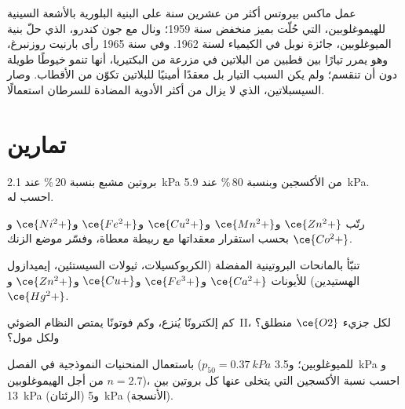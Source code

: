 \begin{history}
عمل ماكس بيروتس أكثر من عشرين سنة على البنية البلورية بالأشعة السينية
للهيموغلوبين، التي حُلّت بميز منخفض سنة 1959؛ ونال مع جون كندرو، الذي حلّ
بنية الميوغلوبين، جائزة نوبل في الكيمياء لسنة 1962. وفي سنة 1965 رأى بارنيت
روزنبرغ، وهو يمرر تيارًا بين قطبين من البلاتين في مزرعة من
البكتيريا، أنها تنمو خيوطًا طويلة دون أن تنقسم؛ ولم يكن السبب
التيار بل معقدًا أمينيًا للبلاتين تكوّن من الأقطاب. وصار
السيسبلاتين، الذي لا يزال من أكثر الأدوية المضادة للسرطان استعمالًا.
\end{history}

\section{تمارين}

\begin{exercise}[$\star$]\label{exo:b3:bioinorganic:1}
بروتين مشبع بنسبة 20\,\% عند \qty{2.1}{kPa} من الأكسجين وبنسبة 80\,\% عند \qty{5.9}{kPa}. احسب
 له.
\end{exercise}

\begin{exercise}[$\star$]\label{exo:b3:bioinorganic:2}
رتّب $\ce{Zn^2+}$ و$\ce{Mn^2+}$ و$\ce{Cu^2+}$ و$\ce{Fe^2+}$ و$\ce{Ni^2+}$ و$\ce{Co^2+}$ بحسب استقرار معقداتها مع
ربيطة معطاة، وفسّر موضع الزنك.
\end{exercise}

\begin{exercise}[$\star$]\label{exo:b3:bioinorganic:3}
تنبّأ بالمانحات البروتينية المفضلة (الكربوكسيلات، ثيولات السيستئين،
إيميدازول الهستيدين) للأيونات $\ce{Ca^2+}$ و$\ce{Fe^3+}$ و$\ce{Cu+}$ و$\ce{Zn^2+}$ و$\ce{Hg^2+}$.
\end{exercise}

\begin{exercise}[$\star$]\label{exo:b3:bioinorganic:4}
كم إلكترونًا يُنزع، وكم فوتونًا يمتص النظام الضوئي~II،
لكل جزيء $\ce{O2}$ منطلق؟ ولكل مول؟
\end{exercise}

\begin{exercise}[$\star\star$]\label{exo:b3:bioinorganic:5}
باستعمال المنحنيات النموذجية في الفصل ($p_{50} = \qty{0.37}{kPa}$ للميوغلوبين؛ و\qty{3.5}{kPa} و$n = 2.7$ من أجل
الهيموغلوبين)، احسب نسبة الأكسجين التي يتخلى عنها كل بروتين بين
\qty{13}{kPa} (الرئتان) و\qty{5}{kPa} (الأنسجة).
\end{exercise}

